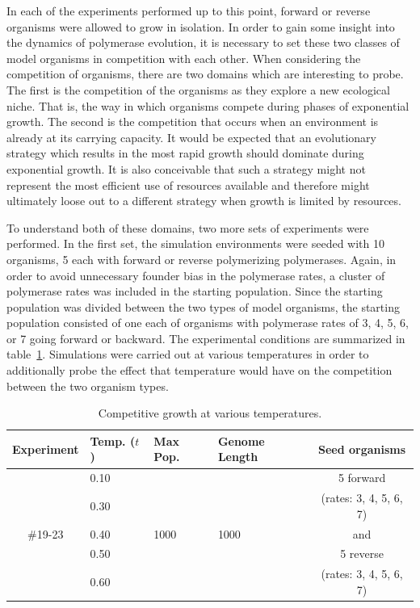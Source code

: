 In each of the experiments performed up to this point, forward or reverse organisms were allowed to grow in isolation. In order to gain some insight into the dynamics of polymerase evolution, it is necessary to set these two classes of model organisms in competition with each other. When considering the competition of organisms, there are two domains which are interesting to probe. The first is the competition of the organisms as they explore a new ecological niche. That is, the way in which organisms compete during phases of exponential growth. The second is the competition that occurs when an environment is already at its carrying capacity. It would be expected that an evolutionary strategy which results in the most rapid growth should dominate during exponential growth. It is also conceivable that such a strategy might not represent the most efficient use of resources available and therefore might ultimately loose out to a different strategy when growth is limited by resources.

To understand both of these domains, two more sets of experiments were performed. In the first set, the simulation environments were seeded with 10 organisms, 5 each with forward or reverse polymerizing polymerases. Again, in order to avoid unnecessary founder bias in the polymerase rates, a cluster of polymerase rates was included in the starting population. Since the starting population was divided between the two types of model organisms, the starting population consisted of one each of organisms with polymerase rates of 3, 4, 5, 6, or 7 going forward or backward. The experimental conditions are summarized in table~\ref{tab:cluster_growth}. Simulations were carried out at various temperatures in order to additionally probe the effect that temperature would have on the competition between the two organism types.

\begin{table}
	\begin{center}
		\begin{tabular}[c]{ c | l | l | l | c }
			Experiment & Temp. ($t$) & Max Pop. & Genome Length & Seed organisms \\
			\hline
			& 0.10 & & & 5 forward\\
			& 0.30 & & & (rates: 3, 4, 5, 6, 7)\\
			\#19-23 & 0.40 & 1000 & 1000 & and\\
			& 0.50 & & & 5 reverse\\
			& 0.60 & & & (rates: 3, 4, 5, 6, 7)\\
		\end{tabular}
		\caption{Competitive growth at various temperatures.}
		\label{tab:cluster_growth}
	\end{center}
\end{table}



